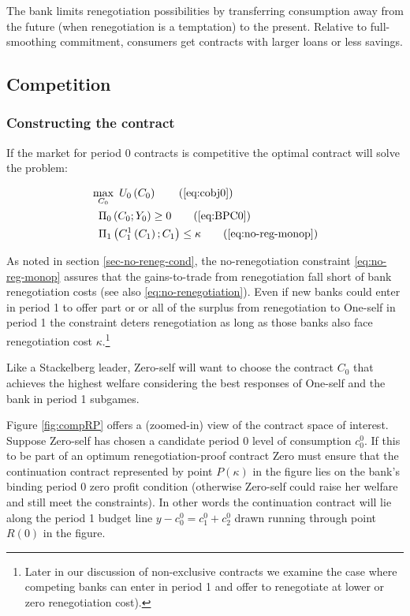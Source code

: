 \documentclass[11pt,english]{article}
\theoremstyle{plain}
\theoremstyle{definition}
\begin{document}
The bank limits renegotiation possibilities by transferring consumption
away from the future (when renegotiation is a temptation) to the present.
Relative to full-smoothing commitment, consumers get contracts with
larger loans or less savings.

\subsection{Competition}

\subsubsection{Constructing the contract}

If the market for period 0 contracts is competitive the optimal contract
will solve the problem:

\begin{align}
 & \max_{C_{0}}\ U_{0}\left(C_{0}\right)\tag{\ref{eq:cobj0}}\\
 & \ \ \Pi_{0}\left(C_{0};Y_{0}\right)\geq0\tag{\ref{eq:BPC0}}\\
 & \ \ \Pi_{1}\left(C_{1}^{1}\left(C_{1}\right);C_{1}\right)\leq\kappa\tag{\ref{eq:no-reg-monop}}
\end{align}

As noted in section \ref{sec-no-reneg-cond}, the no-renegotiation
constraint \ref{eq:no-reg-monop} assures that the gains-to-trade
from renegotiation fall short of bank renegotiation costs (see also
\ref{eq:no-renegotiation}). Even if new banks could enter in period
1 to offer part or or all of the surplus from renegotiation to One-self
in period 1 the constraint deters renegotiation as long as those banks
also face renegotiation cost $\kappa$.\footnote{Later in our discussion of non-exclusive contracts we examine the
case where competing banks can enter in period 1 and offer to renegotiate
at lower or zero renegotiation cost).}

Like a Stackelberg leader, Zero-self will want to choose the contract
$C_{0}$ that achieves the highest welfare considering the best responses
of One-self and the bank in period 1 subgames.

Figure \ref{fig:compRP} offers a (zoomed-in) view of the
contract space of interest. Suppose Zero-self has chosen a candidate
period 0 level of consumption $c_{0}^{0}$. If this to be part of
an optimum renegotiation-proof contract Zero must ensure that the
continuation contract represented by point $P(\kappa)$ in the figure
lies on the bank's binding period 0 zero profit condition (otherwise
Zero-self could raise her welfare and still meet the constraints).
In other words the continuation contract will lie along the period
1 budget line $y-c_{0}^{0}=c_{1}^{0}+c_{2}^{0}$ drawn running through
point $R(0)$ in the figure.
\end{document}
